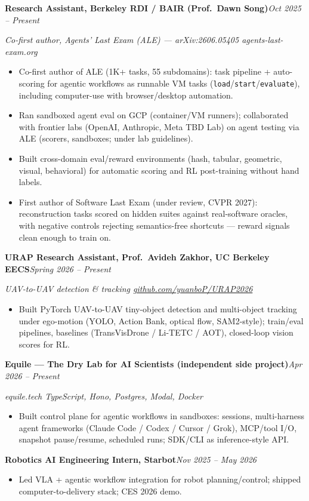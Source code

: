 \documentclass[10pt, letterpaper]{article}
\newcommand{\role}[2]{%
  \vspace{3pt}%
  \noindent\textbf{#1}\hfill\textit{#2}\par
}
\newcommand{\rolesub}[1]{%
  \noindent\textit{#1}\par\vspace{0.5pt}%
}
\begin{document}
\role{Research Assistant, Berkeley RDI / BAIR (Prof.\ Dawn Song)}{Oct 2025 -- Present}
\rolesub{Co-first author, Agents' Last Exam (ALE) --- arXiv:2606.05405 \quad agents-last-exam.org}
\begin{itemize}
  \item Co-first author of ALE (1K+ tasks, 55 subdomains): task pipeline + auto-scoring for agentic workflows as runnable VM tasks (\texttt{load}/\texttt{start}/\texttt{evaluate}), including computer-use with browser/desktop automation.
  \item Ran sandboxed agent eval on GCP (container/VM runners); collaborated with frontier labs (OpenAI, Anthropic, Meta TBD Lab) on agent testing via ALE (scorers, sandboxes; under lab guidelines).
  \item Built cross-domain eval/reward environments (hash, tabular, geometric, visual, behavioral) for automatic scoring and RL post-training without hand labels.
  \item First author of Software Last Exam (under review, CVPR 2027): reconstruction tasks scored on hidden suites against real-software oracles, with negative controls rejecting semantics-free shortcuts --- reward signals clean enough to train on.
\end{itemize}

\role{URAP Research Assistant, Prof.\ Avideh Zakhor, UC Berkeley EECS}{Spring 2026 -- Present}
\rolesub{UAV-to-UAV detection \& tracking \quad \href{https://github.com/yuanboP/URAP2026}{github.com/yuanboP/URAP2026}}
\begin{itemize}
  \item Built PyTorch UAV-to-UAV tiny-object detection and multi-object tracking under ego-motion (YOLO, Action Bank, optical flow, SAM2-style); train/eval pipelines, baselines (TransVisDrone / Li-TETC / AOT), closed-loop vision scores for RL.
\end{itemize}

\role{Equile --- The Dry Lab for AI Scientists (independent side project)}{Apr 2026 -- Present}
\rolesub{equile.tech \quad TypeScript, Hono, Postgres, Modal, Docker}
\begin{itemize}
  \item Built control plane for agentic workflows in sandboxes: sessions, multi-harness agent frameworks (Claude Code / Codex / Cursor / Grok), MCP/tool I/O, snapshot pause/resume, scheduled runs; SDK/CLI as inference-style API.
\end{itemize}

\role{Robotics AI Engineering Intern, Starbot}{Nov 2025 -- May 2026}
\begin{itemize}
  \item Led VLA + agentic workflow integration for robot planning/control; shipped computer-to-delivery stack; CES 2026 demo.
\end{itemize}
\end{document}
